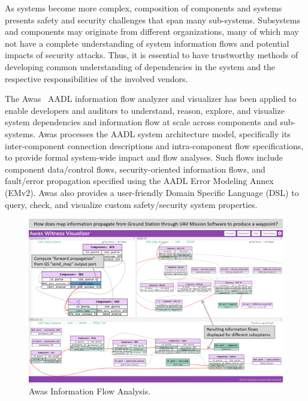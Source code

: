 
As systems become more complex, composition of components and 
systems presents safety and security challenges that span
many sub-systems.  Subsystems and components may originate from
different organizations, many of which may not have a complete
understanding of system information flows and potential impacts of
security attacks.  Thus, it is essential to have trustworthy methods
of developing common understanding of dependencies in the system and
the respective responsibilities of the involved vendors.  

The Awas~\cite{awas} AADL information flow analyzer and visualizer has been 
applied to enable developers and auditors to understand, reason,
explore, and visualize system dependencies and information flow at
scale across components and sub-systems.  Awas processes the AADL
system architecture model, specifically its inter-component connection
descriptions and intra-component flow specifications, to provide
formal system-wide impact and flow analyses.
Such flows include component data/control flows,
security-oriented information flows, and fault/error propagation
specified using the AADL Error Modeling Annex (EMv2).
Awas also provides a user-friendly Domain Specific Language (DSL) to 
query, check, and visualize custom safety/security system properties.

\begin{figure}
	\centering
	\includegraphics[width=\textwidth]{figs/CASE-Awas.png}
	\caption{Awas Information Flow Analysis.} 
	\label{fig:CASE-Awas} 
\end{figure}

